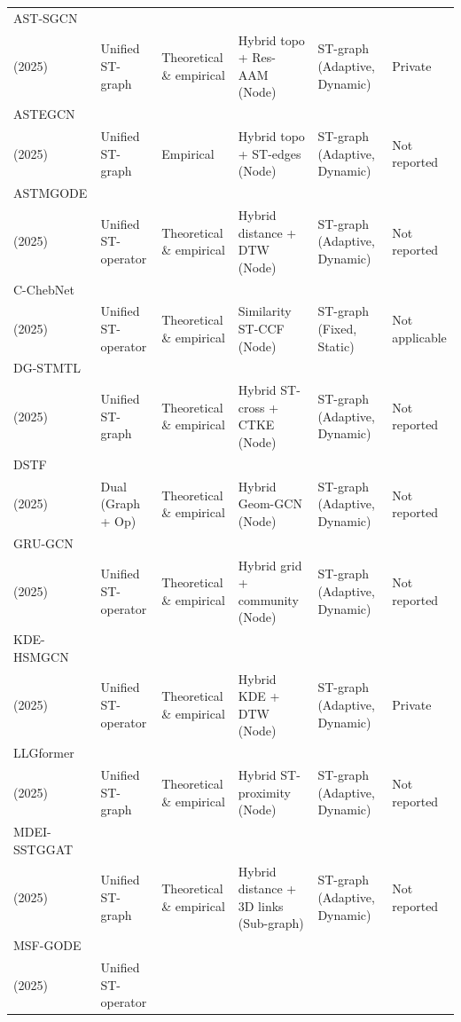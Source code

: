 \begin{longtable}{p{1.5cm} p{1.5cm} p{1.5cm} p{2cm} p{1.5cm} p{2.5cm}}
AST-SGCN\\(2025) ~\cite{wei2025attention}&
Unified ST-graph &
Theoretical \& empirical &
Hybrid topo + Res-AAM (Node) &
ST-graph (Adaptive, Dynamic) &
Private 
\\
ASTEGCN\\(2025) ~\cite{zeng2025aste}&
Unified ST-graph &
Empirical &
Hybrid topo + ST-edges (Node) &
ST-graph (Adaptive, Dynamic) &
Not reported
\\
\hline
ASTMGODE\\(2025) ~\cite{chen2025attention}&
Unified ST-operator &
Theoretical \& empirical &
Hybrid distance + DTW (Node) &
ST-graph (Adaptive, Dynamic) &
Not reported
\\
\hline
C-ChebNet\\(2025) ~\cite{sun2025chebnet}&
Unified ST-operator &
Theoretical \& empirical &
Similarity ST-CCF (Node) &
ST-graph (Fixed, Static) &
Not applicable
\\
\hline
DG-STMTL\\(2025) ~\cite{cui2025dg}&
Unified ST-graph &
Theoretical \& empirical &
Hybrid ST-cross + CTKE (Node) &
ST-graph (Adaptive, Dynamic) &
Not reported
\\
\hline
DSTF\\(2025) ~\cite{wang2025dstf}&
Dual (Graph + Op) &
Theoretical \& empirical &
Hybrid Geom-GCN (Node) &
ST-graph (Adaptive, Dynamic) &
Not reported
\\
\hline
GRU-GCN\\(2025) ~\cite{mayme2025hybrid}&
Unified ST-operator &
Theoretical \& empirical &
Hybrid grid + community (Node) &
ST-graph (Adaptive, Dynamic) &
Not reported
\\
\hline
KDE-HSMGCN\\(2025) ~\cite{xu2025heterogeneous}&
Unified ST-operator &
Theoretical \& empirical &
Hybrid KDE + DTW (Node) &
ST-graph (Adaptive, Dynamic) &
Private 
\\
\hline
LLGformer\\(2025) ~\cite{jin2025llgformer}&
Unified ST-graph &
Theoretical \& empirical &
Hybrid ST-proximity (Node) &
ST-graph (Adaptive, Dynamic) &
Not reported
\\
\hline
MDEI-SSTGGAT\\(2025) ~\cite{zhang2025synchronous}&
Unified ST-graph &
Theoretical \& empirical &
Hybrid distance + 3D links (Sub-graph) &
ST-graph (Adaptive, Dynamic) &
Not reported
\\
\hline
MSF-GODE\\(2025) ~\cite{liu2025msf}&
Unified ST-operator &

\end{longtable}
